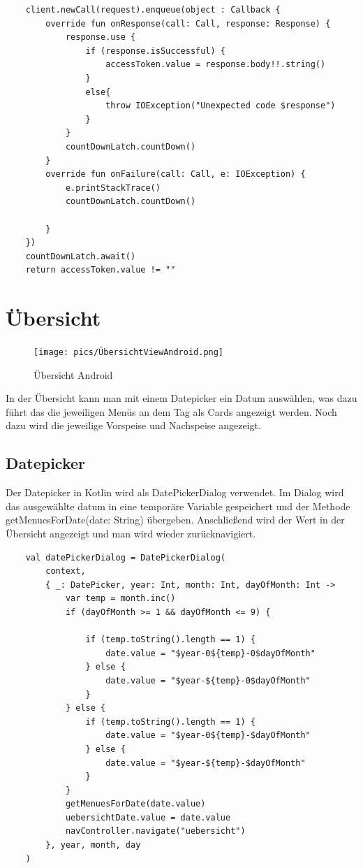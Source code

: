 \begin{lstlisting}
    client.newCall(request).enqueue(object : Callback {
        override fun onResponse(call: Call, response: Response) {
            response.use {
                if (response.isSuccessful) {
                    accessToken.value = response.body!!.string()
                }
                else{
                    throw IOException("Unexpected code $response")
                }
            }
            countDownLatch.countDown()
        }
        override fun onFailure(call: Call, e: IOException) {
            e.printStackTrace()
            countDownLatch.countDown()

        }
    })
    countDownLatch.await()
    return accessToken.value != ""
\end{lstlisting}

\pagebreak
\section{Übersicht}
\begin{figure}[htp]
    \centering
    \author{Bozidar Spasenovic}
    \texttt{[image: pics/ÜbersichtViewAndroid.png]}
    \caption{Übersicht Android}
    \label{fig:impl:ÜbersichtViewAndroid}
\end{figure}

In der Übersicht kann man mit einem Datepicker ein Datum auswählen, was dazu führt das die jeweiligen Menüs an dem Tag 
als Cards angezeigt werden. Noch dazu wird die jeweilige Vorspeise und Nachspeise angezeigt.

\subsection{Datepicker}
Der Datepicker in Kotlin wird als DatePickerDialog verwendet. Im Dialog wird das ausgewählte datum in eine temporäre Variable gespeichert
und der Methode getMenuesForDate(date: String) übergeben. Anschließend wird der Wert in der Übersicht angezeigt und man wird wieder zurücknavigiert.

\begin{lstlisting}
    val datePickerDialog = DatePickerDialog(
        context,
        { _: DatePicker, year: Int, month: Int, dayOfMonth: Int ->
            var temp = month.inc()
            if (dayOfMonth >= 1 && dayOfMonth <= 9) {

                if (temp.toString().length == 1) {
                    date.value = "$year-0${temp}-0$dayOfMonth"
                } else {
                    date.value = "$year-${temp}-0$dayOfMonth"
                }
            } else {
                if (temp.toString().length == 1) {
                    date.value = "$year-0${temp}-$dayOfMonth"
                } else {
                    date.value = "$year-${temp}-$dayOfMonth"
                }
            }
            getMenuesForDate(date.value)
            uebersichtDate.value = date.value
            navController.navigate("uebersicht")
        }, year, month, day
    )
\end{lstlisting}


